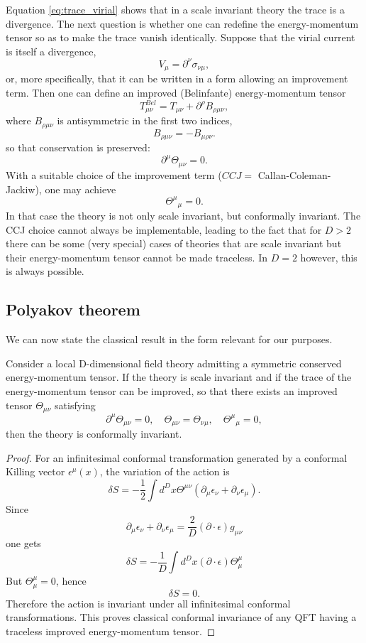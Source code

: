 Equation \eqref{eq:trace_virial} shows that in a scale invariant theory the trace is a divergence. The next question is whether one can redefine the energy-momentum tensor so as to make the trace vanish identically.
Suppose that the virial current is itself a divergence,
\[
    V_{\mu}=\partial^{\nu}\sigma_{\nu\mu},
\]
or, more specifically, that it can be written in a form allowing an improvement term.
Then one can define an improved (Belinfante) energy-momentum tensor
\begin{equation}
    T_{\mu\nu}^{Bel}=T_{\mu\nu}+\partial^{\rho}B_{\rho\mu\nu},
    \label{eq:Belinfante_energy_momentum_tensor}
\end{equation}
where \(B_{\rho\mu\nu}\) is antisymmetric in the first two indices,
\[
    B_{\rho\mu\nu}=-B_{\mu\rho\nu}.
\]
so that conservation is preserved:
\[
    \partial^{\mu}\Theta_{\mu\nu}=0.
\]
With a suitable choice of the improvement term (\(CCJ=\) Callan-Coleman-Jackiw), one may achieve
\[
    {\Theta^{\mu}}_{\mu}=0.
\]
In that case the theory is not only scale invariant, but conformally invariant. The CCJ choice cannot always be implementable, leading to the fact that for \(D>2\) there can be some (very special) cases of theories that are scale invariant but their energy-momentum tensor cannot be made traceless. In \(D=2\) however, this is always possible.

\subsection{Polyakov theorem}
We can now state the classical result in the form relevant for our purposes.

\begin{theorem}
    Consider a local D-dimensional field theory admitting a symmetric conserved energy-momentum tensor. If the theory is scale invariant and if the trace of the energy-momentum tensor can be improved, so that there exists an improved tensor \(\Theta_{\mu\nu}\) satisfying
    \[
        \partial^{\mu}\Theta_{\mu\nu}=0, \quad \Theta_{\mu\nu}=\Theta_{\nu\mu}, \quad {\Theta^{\mu}}_{\mu}=0,
    \]
    then the theory is conformally invariant.
\end{theorem}

\begin{proof}
    For an infinitesimal conformal transformation generated by a conformal Killing vector \(\epsilon^{\mu}(x)\), the variation of the action is
    \[
        \delta S=-\frac{1}{2}\int d^{D}x\Theta^{\mu\nu}(\partial_{\mu}\epsilon_{\nu}+\partial_{\nu}\epsilon_{\mu}).
    \]
    Since
    \[
        \partial_{\mu}\epsilon_{\nu}+\partial_{\nu}\epsilon_{\mu}=\frac{2}{D}(\partial\cdot\epsilon)g_{\mu\nu}
    \]
    one gets
    \[
        \delta S=-\frac{1}{D}\int d^{D}x(\partial\cdot\epsilon)\Theta_{\mu}^{\mu}
    \]
    But \(\Theta_{\mu}^{\mu}=0\), hence
    \[
        \delta S=0.
    \]
    Therefore the action is invariant under all infinitesimal conformal transformations.
    This proves classical conformal invariance of any QFT having a traceless improved energy-momentum tensor.
\end{proof}

